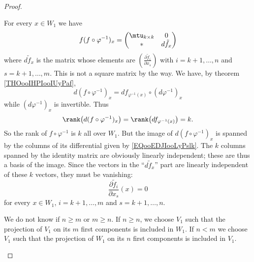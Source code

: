 \begin{proof}
\begin{subproof}
\begin{subproof}
                    For every \( x\in W_1\) we have
                    \begin{equation}        \label{EQooEDJIooLyPslk}
                        f(f\circ \varphi^{-1})_x=\begin{pmatrix}
                            \mtu_{k\times k}    &   0    \\ 
                            *    &   d\tilde f_x    
                        \end{pmatrix}
                    \end{equation}
                    where \( d\tilde f_x\) is the matrix whose elements are \( \left( \frac{ \partial \tilde f_i }{ \partial x_s } \right)\) with \( i=k+1,\ldots, n\) and \( s=k+1,\ldots, m\). This is not a square matrix by the way. We have, by theorem \ref{THOooIHPIooIUyPaf},
                    \begin{equation}
                        d(f\circ\varphi^{-1})_x=df_{\varphi^{-1}(x)}\circ(d\varphi^{-1})_x
                    \end{equation}
                    while \( (d\varphi^{-1})_x\) is invertible. Thus
                    \begin{equation}
                        \rank\big( d(f\circ\varphi^{-1})_x \big)=\rank\big( df_{\varphi^{-1}(x)} \big)=k.
                    \end{equation}
                    So the rank of \( f\circ\varphi^{-1}\) is \( k\) all over \( W_1\). But the image of \( d(f\circ\varphi^{-1})_x\) is spanned by the columns of its differential given by \eqref{EQooEDJIooLyPslk}. The \( k \) columns spanned by the identity matrix are obviously linearly independent; these are thus a basis of the image. Since the vectors in the ``\( d\tilde f_x\)'' part are linearly independent of these \( k\) vectors, they must be vanishing:
                    \begin{equation}
                        \frac{ \partial \tilde f_i }{ \partial x_s }(x)=0
                    \end{equation}
                    for every \( x\in W_1\), \( i=k+1,\ldots, m\) and \( s=k+1,\ldots, n\).


                    We do not know if \( n\geq m\) or \( m\geq n\). If \( n\geq n\), we choose \( V_1\) such that the projection of \( V_1\) on its \( m\) first components is included in \( W_1\). If \( n<m\) we choose \( V_1\) such that the projection of \( W_1\) on its \( n\) first components is included in \( V_1\).


\end{subproof}
\end{subproof}
\end{proof}
